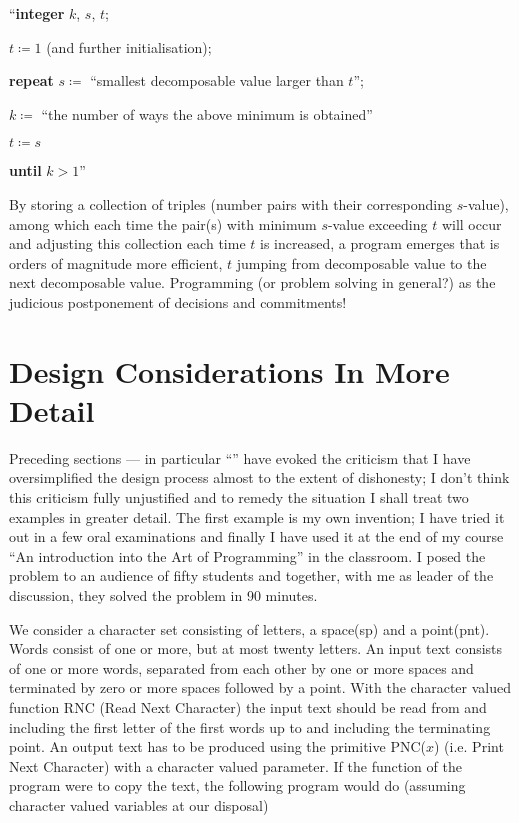 ``\textbf{integer} $k$, $s$, $t$;

$t \coloneq 1$ (and further initialisation);

\textbf{repeat} $s \coloneq$ ``smallest decomposable value larger than $t$'';

\quad $k \coloneq$ ``the number of ways the above minimum is obtained''

\quad $t \coloneq s$

\textbf{until} $k > 1$''

By storing a collection of triples (number pairs with their corresponding $s$-value), among which each time the pair(s) with minimum $s$-value exceeding $t$ will occur and adjusting this collection each time $t$ is increased, a program emerges that is orders of magnitude more efficient, $t$ jumping from decomposable value to the next decomposable value. Programming (or problem solving in general?) as the judicious postponement of decisions and commitments!

\section[Design considerations in more detail]{Design Considerations In More Detail}

Preceding sections --- in particular ``'' have evoked the criticism that I have oversimplified the design process almost to the extent of dishonesty; I don't think this criticism fully unjustified and to remedy the situation I shall treat two examples in greater detail. The first example is my own invention; I have tried it out in a few oral examinations and finally I have used it at the end of my course ``An introduction into the Art of Programming'' in the classroom. I posed the problem to an audience of fifty students and together, with me as leader of the discussion, they solved the problem in 90 minutes.

We consider a character set consisting of letters, a space(sp) and a point(pnt). Words consist of one or more, but at most twenty letters. An input text consists of one or more words, separated from each other by one or more spaces and terminated by zero or more spaces followed by a point. With the character valued function RNC (Read Next Character) the input text should be read from and including the first letter of the first words up to and including the terminating point. An output text has to be produced using the primitive PNC($x$) (i.e. Print Next Character) with a character valued parameter. If the function of the program were to copy the text, the following program would do (assuming character valued variables at our disposal)

